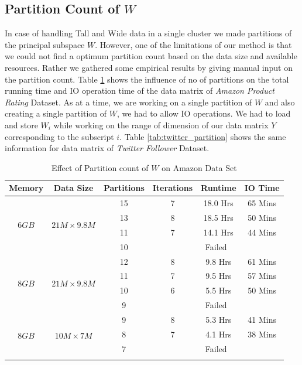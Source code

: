 \documentclass[12pt,notitlepage,oneside]{report}
\begin{document}
\subsection{Partition Count of $W$}
In case of handling Tall and Wide data in a single cluster we made partitions of the principal subspace $W$. However, one of the limitations of our method is that we could not find a optimum partition count based on the data size and available resources. Rather we gathered some empirical results by giving manual input on the partition count. Table \ref{tab:amazon_partition} shows the influence of no of partitions on the total running time and IO operation time of the data matrix of \textit{Amazon Product Rating} Dataset. As at a time, we are working on a single partition of $W$ and also creating a single partition of $W$, we had to allow IO operations. We had to load and store $W_i$ while working on 
the range of dimension of our data matrix $Y$ corresponding to the subscript $i$. Table \ref{tab:twitter_partition} shows the same information for data matrix of \textit{Twitter Follower} Dataset.

\begin{table}[!htbp]
    \centering
    \begin{tabular}{|c|c|c|c|c|c|}
    \hline
    Memory &Data Size &Partitions &Iterations &Runtime &IO Time \\
    \hline
    \multirow{4}{17pt}{$6GB$}  & \multirow{4}{7em}{$21M \times 9.8M$} &15  &7		&18.0 Hrs   	  &65 Mins\\
    \cline{3-6}
         & & 13 &8		&18.5 Hrs   	  &50 Mins\\
    \cline{3-6}
         & & 11 &7		&14.1 Hrs   	  &44 Mins\\
    \cline{3-6}
         & & 10 &\multicolumn{3}{|c|}{Failed} \\
    \hline
    
    \multirow{4}{17pt}{$8GB$}  & \multirow{4}{7em}{$21M \times 9.8M$} &12  &8		&9.8 Hrs   	  &61 Mins\\
    \cline{3-6}
         & & 11 &7		&9.5 Hrs     	  &57 Mins\\
    \cline{3-6}
         & & 10 &6		&5.5 Hrs   	  &50 Mins\\
    \cline{3-6}
         & & 9 &\multicolumn{3}{|c|}{Failed} \\
    \hline
    
    \multirow{4}{17pt}{$8GB$}  & \multirow{4}{7em}{$10M \times 7M$} &9  &8		 &5.3 Hrs   	  &41 Mins\\
    \cline{3-6}
         & & 8 &7		 &4.1 Hrs    	  &38 Mins\\
    \cline{3-6}
         & & 7 &\multicolumn{3}{|c|}{Failed} \\
    \hline
    \multicolumn{6}{c}{}
    \end{tabular}
    \caption{Effect of Partition count of $W$ on Amazon Data Set }
    \label{tab:amazon_partition}
\end{table}
\end{document}
